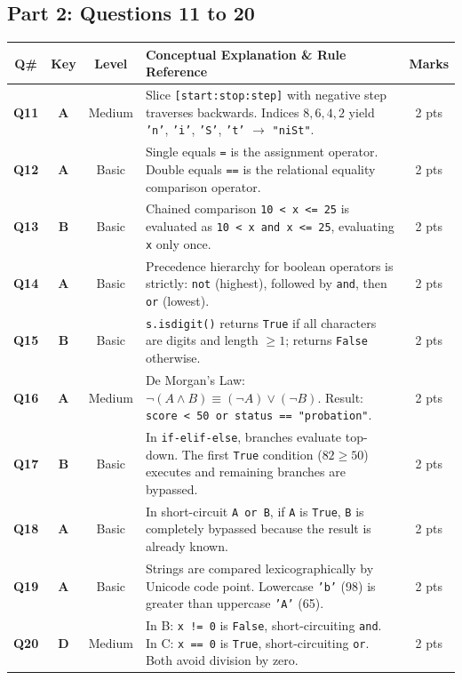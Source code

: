 \documentclass[11pt,a4paper]{article}
\begin{document}
\newpage

\subsection*{Part 2: Questions 11 to 20}

\begin{center}
\renewcommand{\arraystretch}{1.15}
\setlength{\tabcolsep}{3.5pt}
\begin{tabularx}{\textwidth}{|c|c|c|X|c|}
\hline
\textbf{Q\#} & \textbf{Key} & \textbf{Level} & \textbf{Conceptual Explanation \& Rule Reference} & \textbf{Marks} \\
\hline
\textbf{Q11} & \textbf{A} & Medium & Slice \texttt{[start:stop:step]} with negative step traverses backwards. Indices $8, 6, 4, 2$ yield \texttt{'n'}, \texttt{'i'}, \texttt{'S'}, \texttt{'t'} $\rightarrow$ \texttt{"niSt"}. & 2 pts \\
\hline
\textbf{Q12} & \textbf{A} & Basic & Single equals \texttt{=} is the assignment operator. Double equals \texttt{==} is the relational equality comparison operator. & 2 pts \\
\hline
\textbf{Q13} & \textbf{B} & Basic & Chained comparison \texttt{10 < x <= 25} is evaluated as \texttt{10 < x and x <= 25}, evaluating \texttt{x} only once. & 2 pts \\
\hline
\textbf{Q14} & \textbf{A} & Basic & Precedence hierarchy for boolean operators is strictly: \texttt{not} (highest), followed by \texttt{and}, then \texttt{or} (lowest). & 2 pts \\
\hline
\textbf{Q15} & \textbf{B} & Basic & \texttt{s.isdigit()} returns \texttt{True} if all characters are digits and length $\ge 1$; returns \texttt{False} otherwise. & 2 pts \\
\hline
\textbf{Q16} & \textbf{A} & Medium & De Morgan's Law: $\neg(A \land B) \equiv (\neg A) \lor (\neg B)$. Result: \texttt{score < 50 or status == "probation"}. & 2 pts \\
\hline
\textbf{Q17} & \textbf{B} & Basic & In \texttt{if-elif-else}, branches evaluate top-down. The first \texttt{True} condition ($82 \ge 50$) executes and remaining branches are bypassed. & 2 pts \\
\hline
\textbf{Q18} & \textbf{A} & Basic & In short-circuit \texttt{A or B}, if \texttt{A} is \texttt{True}, \texttt{B} is completely bypassed because the result is already known. & 2 pts \\
\hline
\textbf{Q19} & \textbf{A} & Basic & Strings are compared lexicographically by Unicode code point. Lowercase \texttt{'b'} (98) is greater than uppercase \texttt{'A'} (65). & 2 pts \\
\hline
\textbf{Q20} & \textbf{D} & Medium & In B: \texttt{x != 0} is \texttt{False}, short-circuiting \texttt{and}. In C: \texttt{x == 0} is \texttt{True}, short-circuiting \texttt{or}. Both avoid division by zero. & 2 pts \\
\hline
\end{tabularx}
\end{center}
\end{document}
